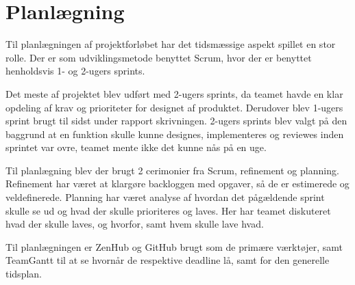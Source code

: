 
\section{Planlægning}

Til planlægningen af projektforløbet har det tidsmæssige aspekt spillet en stor rolle. Der er som udviklingsmetode benyttet Scrum, hvor der er benyttet henholdsvis 1- og 2-ugers sprints.

Det meste af projektet blev udført med 2-ugers sprints, da teamet havde en klar opdeling af krav og prioriteter for designet af produktet. Derudover blev 1-ugers sprint brugt til sidst under rapport skrivningen. 2-ugers sprints blev valgt på den baggrund at en funktion skulle kunne designes, implementeres og reviewes inden sprintet var ovre, teamet mente ikke det kunne nås på en uge.

Til planlægning blev der brugt 2 cerimonier fra Scrum, refinement og planning. Refinement har været at klargøre backloggen med opgaver, så de er estimerede og veldefinerede. Planning har været analyse af hvordan det pågældende sprint skulle se ud og hvad der skulle prioriteres og laves. Her har teamet diskuteret hvad der skulle laves, og hvorfor, samt hvem skulle lave hvad.

Til planlægningen er ZenHub og GitHub brugt som de primære værktøjer, samt TeamGantt til at se hvornår de respektive deadline lå, samt for den generelle tidsplan.